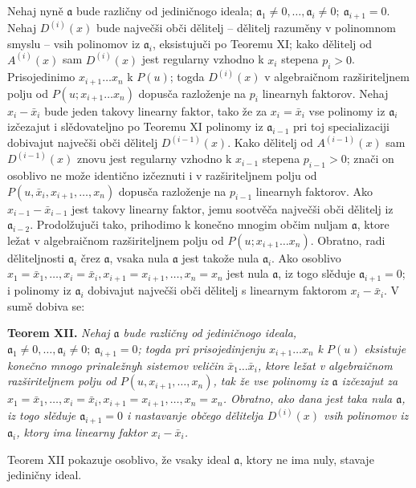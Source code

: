 \documentclass[11pt]{article}
\providecommand{\aideal}{\mathfrak a}
\begin{document}
Nehaj nyně $\aideal$ bude različny od jediničnogo ideala; $\aideal_1\ne0,\ldots,\aideal_i\ne0;\ \aideal_{i+1}=0$. Nehaj $D^{(i)}(x)$ bude največši obči dělitelj -- dělitelj razuměny v polinomnom smyslu -- vsih polinomov iz $\aideal_i$, eksistujuči po Teoremu XI; kako dělitelj od $A^{(i)}(x)$ sam $D^{(i)}(x)$ jest regularny vzhodno k $x_i$ stepena $p_i>0$. Prisojedinimo $x_{i+1}\ldots x_n$ k $P(u)$; togda $D^{(i)}(x)$ v algebraičnom razširiteljnem polju od $P(u;x_{i+1}\ldots x_n)$ dopusča razloženje na $p_i$ linearnyh faktorov. Nehaj $x_i-\bar x_i$ bude jeden takovy linearny faktor, tako že za $x_i=\bar x_i$ vse polinomy iz $\aideal_i$ izčezajut i slědovateljno po Teoremu XI polinomy iz $\aideal_{i-1}$ pri toj specializaciji dobivajut največši obči dělitelj $D^{(i-1)}(x)$. Kako dělitelj od $A^{(i-1)}(x)$ sam $D^{(i-1)}(x)$ znovu jest regularny vzhodno k $x_{i-1}$ stepena $p_{i-1}>0$; znači on osoblivo ne može identično izčeznuti i v razširiteljnem polju od $P(u,\bar x_i,x_{i+1},\ldots,x_n)$ dopusča razloženje na $p_{i-1}$ linearnyh faktorov. Ako $x_{i-1}-\bar x_{i-1}$ jest takovy linearny faktor, jemu sootvěča največši obči dělitelj iz $\aideal_{i-2}$. Prodolžujuči tako, prihodimo k konečno mnogim občim nuljam $\aideal$, ktore ležat v algebraičnom razširiteljnem polju od $P(u;x_{i+1}\ldots x_n)$. Obratno, radi děliteljnosti $\aideal_i$ črez $\aideal$, vsaka nula $\aideal$ jest takože nula $\aideal_i$. Ako osoblivo $x_1=\bar x_1,\ldots,x_i=\bar x_i,x_{i+1}=x_{i+1},\ldots,x_n=x_n$ jest nula $\aideal$, iz togo slěduje $\aideal_{i+1}=0$; i polinomy iz $\aideal_i$ dobivajut največši obči dělitelj s linearnym faktorom $x_i-\bar x_i$. V sumě dobiva se:

\medskip
\noindent\textbf{Teorem XII.} {\itshape Nehaj $\aideal$ bude različny od jediničnogo ideala, $\aideal_1\ne0,\ldots,\aideal_i\ne0;\ \aideal_{i+1}=0$; togda pri prisojedinjenju $x_{i+1}\ldots x_n$ k $P(u)$ eksistuje konečno mnogo prinaležnyh sistemov veličin $\bar x_1\ldots\bar x_i$, ktore ležat v algebraičnom razširiteljnem polju od $P(u,x_{i+1},\ldots,x_n)$, tak že vse polinomy iz $\aideal$ izčezajut za $x_1=\bar x_1,\ldots,x_i=\bar x_i,x_{i+1}=x_{i+1},\ldots,x_n=x_n$. Obratno, ako dana jest taka nula $\aideal$, iz togo slěduje $\aideal_{i+1}=0$ i nastavanje občego dělitelja $D^{(i)}(x)$ vsih polinomov iz $\aideal_i$, ktory ima linearny faktor $x_i-\bar x_i$.}

Teorem XII pokazuje osoblivo, že vsaky ideal $\aideal$, ktory ne ima nuly, stavaje jediničny ideal.
\end{document}
